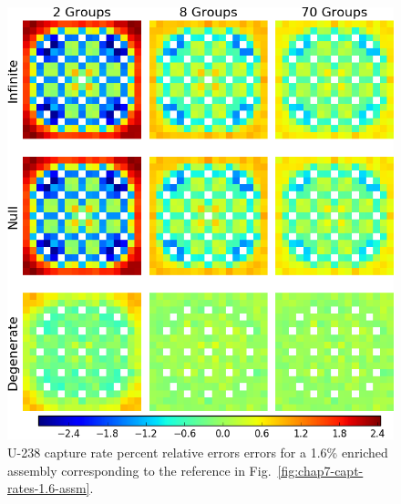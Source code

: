 \begin{appendices}
\begin{figure}[h!]
\centering
\includegraphics[width=\linewidth]{figures/quantification/appendix/assm-16/capt-err}
\vspace{2mm}
\caption[U-238 capture rate errors for a 1.6\% enriched assembly]{U-238 capture rate percent relative errors errors for a 1.6\% enriched assembly corresponding to the reference in Fig.~\ref{fig:chap7-capt-rates-1.6-assm}.}
\label{fig:quantify-assm-1.6-capt-err}
\end{figure}

\clearpage


\end{appendices}
